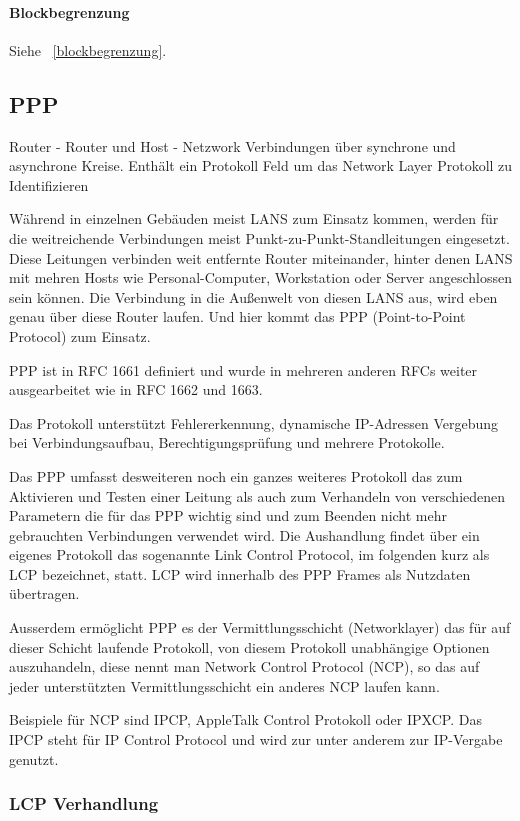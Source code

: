 \documentclass[12pt, a4paper, ngerman]{article}
\begin{document}
\paragraph{Blockbegrenzung}
Siehe ~\ref{blockbegrenzung}.
 
\subsection{PPP}
Router - Router und Host - Netzwork Verbindungen über synchrone und asynchrone Kreise. Enthält ein Protokoll Feld um das Network Layer Protokoll zu Identifizieren \cite[S. 102]{SWB-107223570}  

Während in einzelnen Gebäuden meist LANS zum Einsatz kommen, werden für die weitreichende Verbindungen meist Punkt-zu-Punkt-Standleitungen eingesetzt. Diese Leitungen verbinden weit entfernte Router miteinander, hinter denen LANS mit mehren Hosts wie Personal-Computer, Workstation oder Server angeschlossen sein können. Die Verbindung in die Außenwelt von diesen LANS aus, wird eben genau über diese Router laufen. Und hier kommt das PPP (Point-to-Point Protocol) zum Einsatz.

PPP ist in RFC 1661 definiert und wurde in mehreren anderen RFCs weiter ausgearbeitet wie in RFC 1662 und 1663.

Das Protokoll unterstützt Fehlererkennung, dynamische IP-Adressen Vergebung bei Verbindungsaufbau, Berechtigungsprüfung und mehrere Protokolle.

Das PPP umfasst desweiteren noch ein ganzes weiteres Protokoll das zum Aktivieren und Testen einer Leitung als auch zum Verhandeln von verschiedenen Parametern die für das PPP wichtig sind und zum Beenden nicht mehr gebrauchten Verbindungen verwendet wird. Die Aushandlung findet über ein eigenes Protokoll das sogenannte Link Control Protocol, im folgenden kurz als LCP bezeichnet, statt. LCP wird innerhalb des PPP Frames als Nutzdaten übertragen.

Ausserdem ermöglicht PPP es der Vermittlungsschicht (Networklayer) das für auf dieser Schicht laufende Protokoll, von diesem Protokoll unabhängige Optionen auszuhandeln, diese nennt man Network Control Protocol (NCP), so das auf jeder unterstützten Vermittlungsschicht ein anderes NCP laufen kann. 

Beispiele für NCP sind IPCP, AppleTalk Control Protokoll oder IPXCP. Das IPCP steht für IP Control Protocol und wird zur unter anderem zur IP-Vergabe genutzt.


\subsubsection{LCP Verhandlung}
\end{document}
